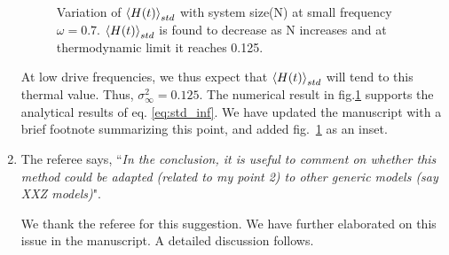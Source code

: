 \documentclass[aps,prb,reprint,showpacs,floatfix,superscriptaddress, onecolumn, nofootinbib, 9pt]{revtex4-2}
\newcommand{\response}[1]{{\color{black}#1}} %
\newcommand{\comment}[1]{{\color{blue}#1}} %
\begin{document}
\begin{enumerate}
{\begin{figure}[h!]
				\caption{Variation of $\expval{H(t)}_{std}$ with system size(N) at small frequency $\omega=0.7$. $\expval{H(t)}_{std}$ is found to decrease as N increases and at thermodynamic limit it reaches 0.125.}
				\label{fig:std_N}
			\end{figure}
		At low drive frequencies, we thus expect that $\expval{H(t)}_{std}$ will tend to this thermal value. Thus, $\sigma_\infty^2 = 0.125$. The numerical result in fig.\ref{fig:std_N} supports the analytical results of eq. \eqref{eq:std_inf}. We have updated the manuscript with a brief footnote summarizing this point, and added fig.~\ref{fig:std_N} as an inset.
		}
		
		
		\vskip 2cm
		\item The referee says, \comment{``\textit{In the conclusion, it is useful to comment on whether this method could be adapted (related to my point 2) to other generic models (say XXZ models)}"}.\\
		
		\response{
			We thank the referee for this suggestion. We have further elaborated on this issue in the manuscript. A detailed discussion follows.
			
}
\end{enumerate}
\end{document}
